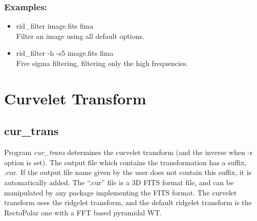 \subsubsection*{Examples:}
\begin{itemize}
\item rid\_filter  image.fits fima\\
Filter an image using all default options.
\item rid\_filter -h -s5 image.fits fima\\
Five sigma filtering, filtering only the high frequencies.
\end{itemize}


\section{Curvelet Transform}
\subsection{cur\_trans}
Program {\em cur\_trans} determines the  curvelet transform 
(and the inverse when -r option is set).  
The output file which contains the transformation has a 
suffix, .cur. If the output file name
given by the user does not contain this suffix, it is automatically
added. The ``.cur'' file is a 3D FITS format file, and can be manipulated by
any package implementing the FITS format.
The curvelet transform uses the ridgelet transform, and the default 
ridgelet transform is the RectoPolar one with a FFT based pyramidal WT.

